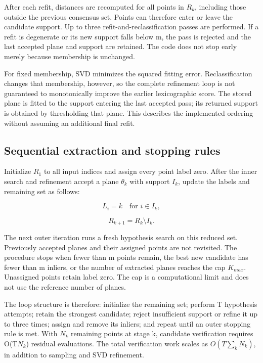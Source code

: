 After each refit, distances are recomputed for all points in \(R_{k}\), including those outside the previous consensus set. Points can therefore enter or leave the candidate support. Up to three refit-and-reclassification passes are performed. If a refit is degenerate or its new support falls below m, the pass is rejected and the last accepted plane and support are retained. The code does not stop early merely because membership is unchanged.

For fixed membership, SVD minimizes the squared fitting error. Reclassification changes that membership, however, so the complete refinement loop is not guaranteed to monotonically improve the earlier lexicographic score. The stored plane is fitted to the support entering the last accepted pass; its returned support is obtained by thresholding that plane. This describes the implemented ordering without assuming an additional final refit.

\subsection{Sequential extraction and stopping rules}\label{sequential-extraction-and-stopping-rules}

Initialize \(R_{1}\) to all input indices and assign every point label zero. After the inner search and refinement accept a plane \(\theta_{k}\) with support \(I_{k}\), update the labels and remaining set as follows:

\begin{equation}
L_i=k\quad\text{for }i\in I_k,
\label{eq:11}
\end{equation}

\begin{equation}
R_{k+1}=R_k\setminus I_k.
\label{eq:12}
\end{equation}

The next outer iteration runs a fresh hypothesis search on this reduced set. Previously accepted planes and their assigned points are not revisited. The procedure stops when fewer than m points remain, the best new candidate has fewer than m inliers, or the number of extracted planes reaches the cap \(K_{max}\). Unassigned points retain label zero. The cap is a computational limit and does not use the reference number of planes.

The loop structure is therefore: initialize the remaining set; perform T hypothesis attempts; retain the strongest candidate; reject insufficient support or refine it up to three times; assign and remove its inliers; and repeat until an outer stopping rule is met. With \(N_{k}\) remaining points at stage k, candidate verification requires O(T\(N_{k}\)) residual evaluations. The total verification work scales as \(O(T\sum_k N_k)\), in addition to sampling and SVD refinement.

